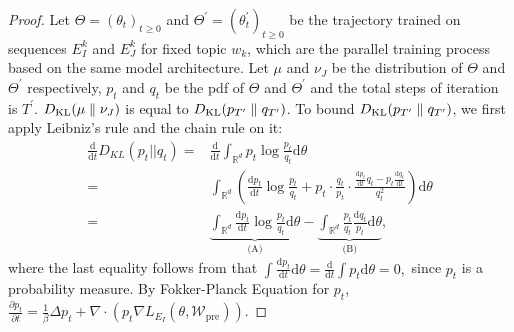 \begin{proof}
	Let $\Theta=(\theta_t)_{t\geq 0}$ and $\Theta^\prime=(\theta_t^\prime)_{t\geq 0}$ be the trajectory trained on sequences ${E}^k_I$ and ${E}^k_J$ for fixed topic $w_k$, which are the parallel training process based on the same model architecture. Let $\mu$ and $\nu_J$ be the distribution of $\Theta$ and $\Theta^\prime$ respectively, $p_t$ and $q_t$ be the pdf of $\Theta$ and $\Theta^\prime$ and the total steps of iteration is $T^\prime$. $D_{\mathrm{KL}}(\mu \parallel \nu_J)$ is equal to $D_{\mathrm{KL}}(p_{T^\prime}\parallel q_{T^\prime})$. To bound $D_{\mathrm{KL}}(p_{T^\prime}\parallel q_{T^\prime})$, we first apply Leibniz’s rule and the chain rule on it:
	$$
	\begin{aligned}
		\frac{\mathrm{d}}{\mathrm{d}t}D_{KL}(p_t||q_t)
		=&\frac{\mathrm{d}}{\mathrm{d}t}\int_{\mathbb{R}^d}p_t\operatorname{log}\frac{p_t}{q_t}\mathrm{d}\theta \\
		=& \int_{\mathbb{R}^d} (\frac{\mathrm{d}p_t}{\mathrm{d}t}\operatorname{log}\frac{p_t}{q_t}+p_t\cdot \frac{q_t}{p_t}\cdot \frac{\frac{\mathrm{d}p_t}{\mathrm{d}t}q_t-p_t\frac{\mathrm{d}q_t}{\mathrm{d}t}}{q_t^2})\mathrm{d}\theta \\
		=& \underbrace{\int_{\mathbb{R}^d} \frac{\mathrm{d}p_t}{\mathrm{d}t}\operatorname{log}\frac{p_t}{q_t}\mathrm{d}\theta}_{\text{(A)}} - \underbrace{\int_{\mathbb{R}^d} \frac{p_t}{q_t}\frac{\mathrm{d}q_t}{p_t}\mathrm{d}\theta}_{\text{(B)}},
	\end{aligned}
	$$
	where the last equality follows from that $\int \frac{\mathrm{d}p_t}{\mathrm{d}t}\mathrm{d}\theta = \frac{\mathrm{d}}{\mathrm{d}t} \int p_t\mathrm{d}\theta = 0,$ since $p_t$ is a probability measure.
	By Fokker-Planck Equation for $p_t$, $\frac{\partial p_t}{\partial t} = \frac1\beta\Delta p_t+\nabla \cdot(p_t \nabla L_{E_I}(\theta, \mathcal{W}_{\text{pre}}))$.
	

\end{proof}
